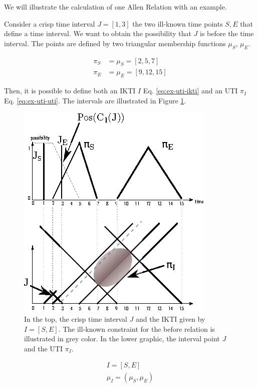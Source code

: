  
We will illustrate the calculation of one Allen Relation with an example.
\begin{example}
Consider a crisp time interval $J = [1, 3]$ the two ill-known time points $S, E$ that define a time interval. 
We want to obtain the possibility that $J$ is before the time interval.
The points are defined by two triangular membership functions $\mu_S$, $\mu_E$.

\begin{align}
\label{eq:ex-point}
\pi_S &= \mu_S = \left[2,5,7 \right] \\
\pi_E &= \mu_E = \left[9,12,15 \right]
\end{align}

Then, it is possible to define both an IKTI $I$ Eq. \eqref{eq:ex-uti-ikti} and an UTI $\pi_I$ Eq. \eqref{eq:ex-uti-uti}. The intervals are illustrated in Figure \ref{fig:example}.

\begin{figure}[h]
   \centering
   \includegraphics[scale=1.5]{graphs/example.eps}
   \caption{In the top, the crisp time interval $J$ and the IKTI given by $I = [S, E]$. The ill-known constraint for the before relation is illustrated in grey color. In the lower graphic, the interval point $J$ and the UTI $\pi_I$. }
   \label{fig:example}
 \end{figure}

\begin{align}
\label{eq:ex-uti-ikti}
I = \left[S, E \right]\\
\label{eq:ex-uti-uti}
\mu_I = \left(\mu_S, \mu_E \right)
\end{align}


\end{example}
